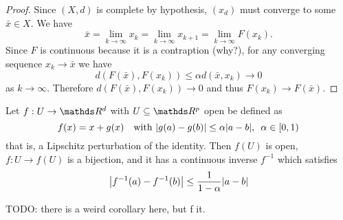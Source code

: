 \documentclass[12pt]{extarticle}
\begin{document}
\begin{proof}
	Since $(X, d)$ is complete by hypothesis, $(x_d)$ must converge to some $\bar x \in X$.
	We have
	\begin{equation}
		\bar x = \lim_{k \to \infty} x_k = \lim_{k \to \infty} x_{k + 1} = \lim_{k \to \infty} F(x_k).
	\end{equation}
	Since $F$ is continuous because it is a contraption (why?), for any converging sequence $x_k \to \bar x$ we have
	\begin{equation}
		d(F(\bar x), F(x_k)) \leq \alpha d(\bar x, x_k) \to 0
	\end{equation}
	as $k \to \infty$.
	Therefore $d(F(\bar x), F(x_k)) \to 0$ and thus $F(x_k) \to F(\bar x)$.
\end{proof}

\begin{theorem}{}{}
	Let $f: U \to \R^d$ with $U \subseteq \R^p$ open be defined as
	\begin{equation}
		f(x) = x + g(x) \quad \text{with } \abs{g(a) - g(b)} \leq \alpha \abs{a - b}, \enspace \alpha \in [0,1)
	\end{equation}
	that is, a Lipschitz perturbation of the identity.
	Then $f(U)$ is open, $f: U \to f(U)$ is a bijection, and it has a continuous inverse $f^{-1}$
	which satisfies
	\begin{equation}
		\abs{f^{-1}(a)- f^{-1}(b)} \leq \frac{1}{1-\alpha} \abs{a-b}
	\end{equation}
\end{theorem}

TODO: there is a weird corollary here, but f it.
\end{document}
